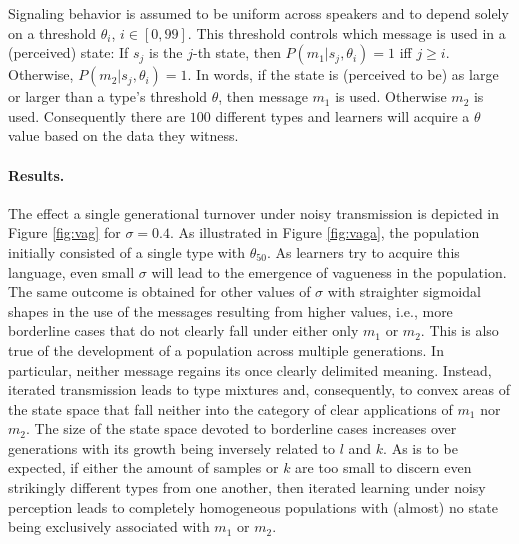 \documentclass[10pt,a4paper]{article}
\begin{document}
Signaling behavior is assumed to be uniform across speakers and to depend solely on a threshold $\theta_i$, $i \in [0,99]$. This threshold controls which message is used in a (perceived) state: If $s_j$ is the $j$-th state, then $P(m_1|s_j,\theta_i) = 1$ iff $j \geq i$. Otherwise, $P(m_2|s_j,\theta_i) = 1$. In words, if the state is (perceived to be) as large or larger than a type's threshold $\theta$, then message $m_1$ is used. Otherwise $m_2$ is used. Consequently there are $100$ different types and learners will acquire a $\theta$ value based on the data they witness.

\paragraph{Results.} The effect a single generational turnover under noisy transmission is depicted in Figure \ref{fig:vag} for $\sigma = 0.4$. As illustrated in Figure \ref{fig:vaga}, the population initially consisted of a single type with $\theta_{50}$. As learners try to acquire this language, even small $\sigma$ will lead to the emergence of vagueness in the population. The same outcome is obtained for other values of $\sigma$ with straighter sigmoidal shapes in the use of the messages resulting from higher values, i.e., more borderline cases that do not clearly fall under either only $m_1$ or $m_2$. This is also true of the development of a population across multiple generations. In particular, neither message regains its once clearly delimited meaning. Instead, iterated transmission leads to type mixtures and, consequently, to convex areas of the state space that fall neither into the category of clear applications of $m_1$ nor $m_2$. The size of the state space devoted to borderline cases increases over generations with its growth being inversely related to $l$ and $k$. As is to be expected, if either the amount of samples or $k$ are too small to discern even strikingly different types from one another, then iterated learning under noisy perception leads to completely homogeneous populations with (almost) no state being exclusively associated with $m_1$ or $m_2$.
\end{document}
